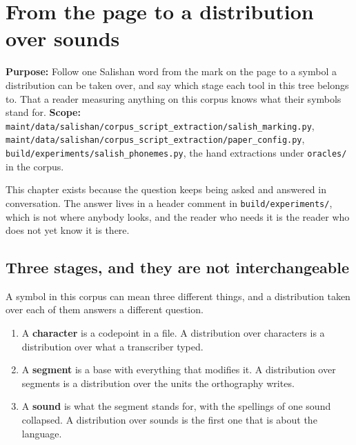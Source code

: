 \chapter{From the page to a distribution over sounds}

\textbf{Purpose:} Follow one Salishan word from the mark on the page to a symbol a distribution can
be taken over, and say which stage each tool in this tree belongs to. That a reader measuring
anything on this corpus knows what their symbols stand for.
\textbf{Scope:}
\texttt{maint/\allowbreak{}data/\allowbreak{}salishan/\allowbreak{}corpus\_\allowbreak{}script\_\allowbreak{}extraction/\allowbreak{}salish\_\allowbreak{}marking.\allowbreak{}py},
\texttt{maint/\allowbreak{}data/\allowbreak{}salishan/\allowbreak{}corpus\_\allowbreak{}script\_\allowbreak{}extraction/\allowbreak{}paper\_\allowbreak{}config.\allowbreak{}py},
\texttt{build/\allowbreak{}experiments/\allowbreak{}salish\_\allowbreak{}phonemes.\allowbreak{}py},
the hand extractions under \texttt{oracles/\allowbreak{}} in the corpus.

This chapter exists because the question keeps being asked and answered in conversation. The answer
lives in a header comment in \texttt{build/\allowbreak{}experiments/\allowbreak{}}, which is not
where anybody looks, and the reader who needs it is the reader who does not yet know it is there.

\section{Three stages, and they are not interchangeable}

A symbol in this corpus can mean three different things, and a distribution taken over each of them
answers a different question.

\begin{enumerate}
  \item A \textbf{character} is a codepoint in a file. A distribution over characters is a
        distribution over what a transcriber typed.
  \item A \textbf{segment} is a base with everything that modifies it. A distribution over segments
        is a distribution over the units the orthography writes.
  \item A \textbf{sound} is what the segment stands for, with the spellings of one sound collapsed.
        A distribution over sounds is the first one that is about the language.
\end{enumerate}

